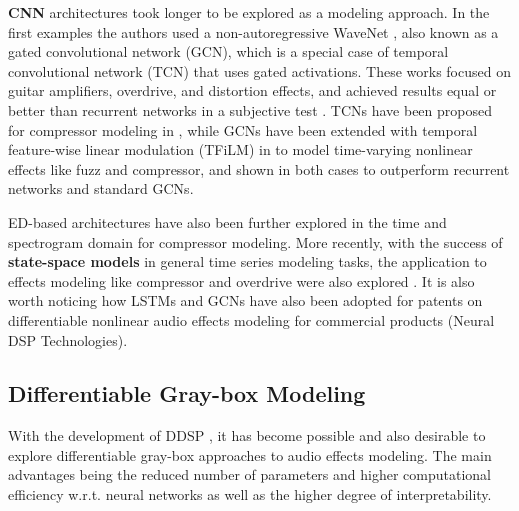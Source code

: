 \textbf{CNN} architectures took longer to be explored as a modeling approach. 
In the first examples 
\citep{damskagg2019real, damskagg2019deep} 
the authors used a non-autoregressive WaveNet 
\citep{rethage2018wavenet}, also known as a gated convolutional network (GCN), which is a special case of temporal convolutional network (TCN) \citep{bai2018empirical} that uses gated activations. 
These works focused on guitar amplifiers, overdrive, and distortion effects, and achieved results equal or better than recurrent networks in a subjective test \citep{wright2020real}.
TCNs have been proposed for compressor modeling in \citep{steinmetz2022efficient}, while GCNs have been extended with temporal feature-wise linear modulation (TFiLM) \citep{birnbaum2019temporal} in \citep{comunita2023modelling} to model time-varying nonlinear effects like fuzz and compressor, and shown in both cases to outperform recurrent networks and standard GCNs.

ED-based architectures have also been further explored in the time \citep{simionato2023fully} and spectrogram \citep{hawley2019profiling, mitchell2020exploring} domain for compressor modeling.
More recently, with the success of \textbf{state-space models} 
\citep{gu2021combining, gu2021efficiently, gu2023mamba} 
in general time series modeling tasks, the application to effects modeling like compressor and overdrive were also explored 
\citep{yin2024modeling, simionato2024comparative, simionato2024modeling}.
It is also worth noticing how LSTMs and GCNs have also been adopted for patents on differentiable nonlinear audio effects modeling for commercial products \citep{borquez2022neural} (Neural DSP Technologies).

\subsection{Differentiable Gray-box Modeling}
\label{sec:back-diff-gray-box}

With the development of DDSP \citep{hayes2024review}, it has become possible and also desirable to explore differentiable gray-box approaches to audio effects modeling. 
The main advantages being the reduced number of parameters and higher computational efficiency w.r.t. neural networks as well as the higher degree of interpretability.

